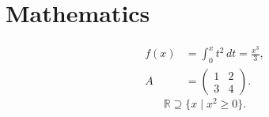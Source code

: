 \documentclass{article}
\begin{document}
\section{Mathematics}
\begin{align} f(x)&=\int_0^x t^2\,dt=\frac{x^3}{3},\\ A&=\begin{pmatrix}1&2\\3&4\end{pmatrix}.\end{align}
\[\mathbb{R}\supseteq\{x\mid x^2\geq 0\}.\]
\end{document}
